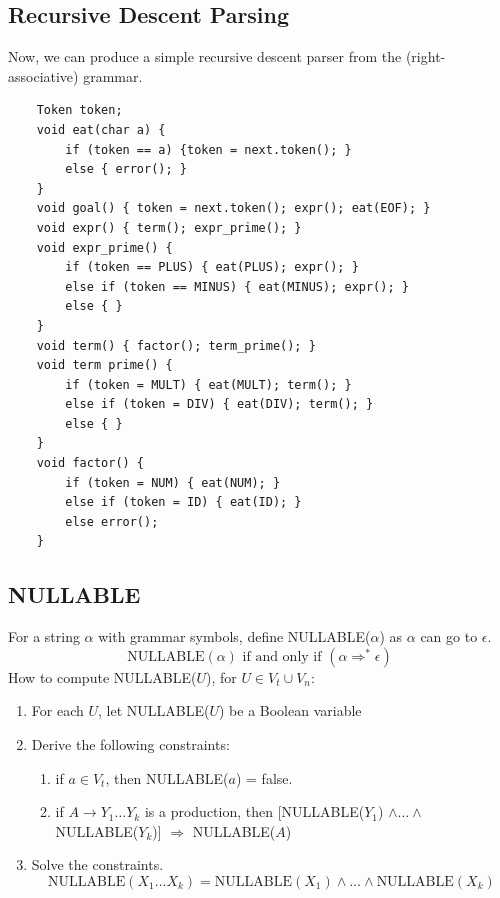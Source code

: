 \documentclass[10pt]{article}
\begin{document}
\subsection*{Recursive Descent Parsing}
Now, we can produce a simple recursive descent parser from the (right-associative) grammar.
\begin{verbatim}
    Token token;
    void eat(char a) {
        if (token == a) {token = next.token(); }
        else { error(); }
    }
    void goal() { token = next.token(); expr(); eat(EOF); }
    void expr() { term(); expr_prime(); }
    void expr_prime() {
        if (token == PLUS) { eat(PLUS); expr(); }
        else if (token == MINUS) { eat(MINUS); expr(); }
        else { }
    }
    void term() { factor(); term_prime(); }
    void term prime() {
        if (token = MULT) { eat(MULT); term(); }
        else if (token = DIV) { eat(DIV); term(); }
        else { }
    }
    void factor() {
        if (token = NUM) { eat(NUM); }
        else if (token = ID) { eat(ID); }
        else error();
    }
\end{verbatim}

\subsection*{NULLABLE}
For a string $\alpha$ with grammar symbols, define NULLABLE($\alpha$) as $\alpha$ can go to $\epsilon$.
\[\text{NULLABLE}(\alpha) \text{ if and only if } (\alpha \Rightarrow^* \epsilon)\]
How to compute NULLABLE($U$), for $U \in V_t \cup V_n$:
\begin{enumerate}
    \item For each $U$, let NULLABLE($U$) be a Boolean variable
    \item Derive the following constraints:
    \begin{enumerate}
        \item if $a \in V_t$, then NULLABLE($a$) = false.
        \item if $A \rightarrow Y_1 \dots Y_k$ is a production, then [NULLABLE($Y_1$) $\land \dots \land$ NULLABLE($Y_k$)] $\Rightarrow$ NULLABLE($A$)
    \end{enumerate}
    \item Solve the constraints.
    \[\text{NULLABLE}(X_1 \dots X_k) = \text{NULLABLE}(X_1) \land \dots \land \text{NULLABLE}(X_k)\]
\end{enumerate}
\end{document}
